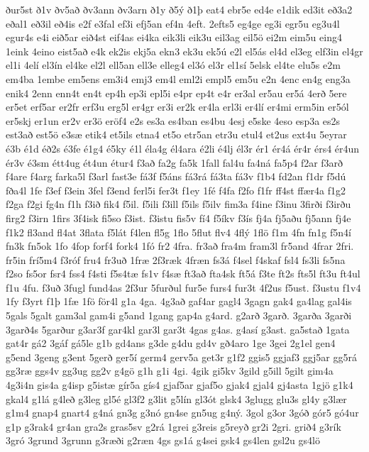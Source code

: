 {ður5st
ð1v
ðv5að
ðv3ann
ðv3arn
ð1y
ð5ý
ð1þ
eat4
ebr5e
ed4e
e1dik
ed3it
eð3a2
eðal1
eð3il
eð4is
e2f
e3fal
ef3i
efj5an
ef4n
4eft.
2efts5
eg4ge
eg3i
egr5u
eg3u4l
egur4s
e4i
eið5ar
eið4st
eif4as
ei4ka
eik3li
eik3u
eil3ag
eil5ö
ei2m
eim5u
eing4
1eink
4eino
eist5að
e4k
ek2is
ekj5a
ekn3
ek3u
ek5ú
e2l
el5ás
el4d
el3eg
elf3in
el4gr
el1i
4elí
el3ín
el4ke
el2l
ell5an
ell3e
elleg4
el3ó
el3r
el1sí
5elsk
el4te
elu5s
e2m
em4ba
1embe
em5ens
em3i4
emj3
em4l
eml2i
empl5
em5u
e2n
4enc
en4g
eng3a
enik4
2enn
enn4t
en4t
ep4h
ep3i
epl5i
e4pr
ep4t
e4r
er3al
er5au
er5á
4erð
5ere
er5et
erf5ar
er2fr
erf3u
erg5l
er4gr
er3i
er2k
er4la
erl3i
er4lí
er4mi
erm5in
er5ól
er5skj
er1un
er2v
er3ö
eröf4
e2s
es3a
es4ban
es4bu
4esj
e5ske
4eso
esp3a
es2s
est3að
est5ö
e3sæ
etik4
et5ils
etna4
et5o
etr5an
etr3u
etul4
et2us
ext4u
5eyrar
é3b
é1d
éð2s
é3fe
é1g4
é5ky
é1l
éla4g
él4ara
é2li
é4lj
él3r
ér1
ér4á
ér4r
érs4
ér4un
ér3v
é3sm
étt4ug
ét4un
étur4
f3að
fa2g
fa5k
1fall
fal4u
fa4ná
fa5p4
f2ar
f3arð
f4are
f4arg
farka5l
f3arl
fast3e
fá3f
f5áns
fá3rá
fá3ta
fá3v
f1b4
fd2an
f1dr
f5dú
fða4l
1fe
f3ef
f3ein
3fel
f3end
ferl5i
fer3t
f1ey
1fé
f4fa
f2fo
f1fr
ff4st
ffær4a
f1g2
f2ga
f2gi
fg4n
f1h
f3ið
fik4
f5il.
f5ili
f3ill
f5ils
f5ilv
fim3a
f4ine
f3inu
3firði
f3irðu
firg2
f3irn
1firs
3f4isk
fi5so
f3ist.
f3istu
fis5v
fí4
f5íkv
f3ís
fj4a
fj5aðu
fj5ann
fj4e
f1k2
fl3and
fl4at
3flata
f5lát
f4len
fl5g
1flo
5flut
flv4
4flý
1flö
f1m
4fn
fn1g
f5n4í
fn3k
fn5ok
1fo
4fop
forf4
fork4
1fó
fr2
4fra.
fr3að
fra4m
fram3l
fr5and
4frar
2fri.
fr5in
frí5m4
f3róf
fru4
fr3uð
1fræ
2f3ræk
4fræn
fs3á
f4sel
f4skaf
fsl4
fs3li
fs5na
f2so
fs5or
fsr4
fss4
f4sti
f5s4tæ
fs1v
f4sæ
ft3að
fta4sk
ft5á
f3te
ft2s
fts5l
ft3u
ft4ul
f1u
4fu.
f3uð
3fugl
fund4as
2f3ur
5furðul
fur5e
furs4
fur3t
4f2us
f5ust.
f3ustu
f1v4
1fy
f3yrt
f1þ
1fæ
1fö
för4l
g1a
4ga.
4g3að
gaf4ar
gagl4
3gagn
gak4
ga4lag
gal4is
5gals
5galt
gam3al
gam4i
g5and
1gang
gap4a
g4ard.
g2arð
3garð.
3garða
3garði
3garð4s
5garður
g3ar3f
gar4kl
gar3l
gar3t
4gas
g4as.
g4así
g3ast.
ga5stað
1gata
gat4r
gá2
3gáf
gá5le
g1b
gd4ans
g3de
g4du
gd4v
gð4aro
1ge
3gei
2g1el
gen4
g5end
3geng
g3ent
5gerð
ger5í
germ4
gerv5a
get3r
g1f2
ggis5
ggjaf3
ggj5ar
gg5rá
gg3ræ
ggs4v
gg3ug
gg2v
g4gö
g1h
g1i
4gi.
4gik
gi5kv
3gild
g5ill
5gilt
gim4a
4g3i4n
gis4a
g4isp
g5istæ
gír5a
gís4
gjaf5ar
gjaf5o
gjak4
gjal4
gj4asta
1gjö
g1k4
gkal4
g1lá
g4leð
g3leg
gl5é
gl3f2
g3lit
g5lín
gl3ót
glsk4
3glugg
glu3s
gl4y
g3lær
g1m4
gnap4
gnart4
g4ná
gn3g
g3nó
gn4se
gn5ug
g4ný.
3gol
g3or
3góð
gór5
gó4ur
g1p
g3rak4
gr4an
gra2s
gras5sv
g2rá
1grei
g3reis
g5reyð
gr2i
2gri.
grið4
g3rík
3gró
3grund
3grunn
g3ræði
g2ræn
4gs
gs1á
g4sei
gsk4
gs4len
gsl2u
gs4lö
}
